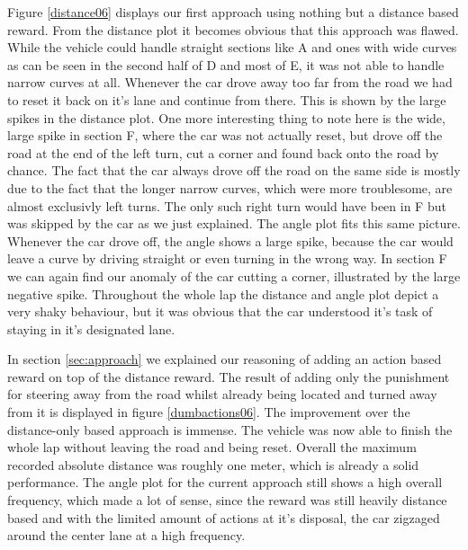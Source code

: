Figure \ref{distance06} displays our first approach using nothing but a distance based reward. From the distance plot it becomes obvious that this approach was flawed. While the vehicle could handle straight sections like A and ones with wide curves as can be seen in the second half of D and most of E, it was not able to handle narrow curves at all. Whenever the car drove away too far from the road we had to reset it back on it's lane and continue from there. This is shown by the large spikes in the distance plot. One more interesting thing to note here is the wide, large spike in section F, where the car was not actually reset, but drove off the road at the end of the left turn, cut a corner and found back onto the road by chance. The fact that the car always drove off the road on the same side is mostly due to the fact that the longer narrow curves, which were more troublesome, are almost exclusivly left turns. The only such right turn would have been in F but was skipped by the car as we just explained. 
The angle plot fits this same picture. Whenever the car drove off, the angle shows a large spike, because the car would leave a curve by driving straight or even turning in the wrong way. In section F we can again find our anomaly of the car cutting a corner, illustrated by the large negative spike.
Throughout the whole lap the distance and angle plot depict a very shaky behaviour, but it was obvious that the car understood it's task of staying in it's designated lane.

In section \ref{sec:approach} we explained our reasoning of adding an action based reward on top of the distance reward. The result of adding only the punishment for steering away from the road whilst already being located and turned away from it is displayed in figure \ref{dumbactions06}. The improvement over the distance-only based approach is immense. The vehicle was now able to finish the whole lap without leaving the road and being reset. Overall the maximum recorded absolute distance was roughly one meter, which is already a solid performance. The angle plot for the current approach still shows a high overall frequency, which made a lot of sense, since the reward was still heavily distance based and with the limited amount of actions at it's disposal, the car zigzaged around the center lane at a high frequency.

